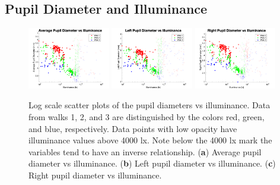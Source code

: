 \documentclass[10pt]{article}
\begin{document}
\subsection{Pupil Diameter and Illuminance}

\begin{figure}[!b]
  \centering
  \includegraphics[width=0.32\textwidth]{./PDvsILM/APDvsILM.png}\label{fig:PDvsILMa}
  \hfill
  \includegraphics[width=0.32\textwidth]{./PDvsILM/LPDvsILM.png}\label{fig:PDvsILMb}
  \includegraphics[width=0.32\textwidth]{./PDvsILM/RPDvsILM.png}\label{fig:PDvsILMc}
  \hfill
  \caption{Log scale scatter plots of the pupil diameters vs illuminance. Data from walks 1, 2, and 3 are distinguished by the colors red, green, and blue, respectively. Data points with low opacity have illuminance values above 4000 lx. Note below the 4000 lx mark the variables tend to have an inverse relationship. (\textbf{a}) Average pupil diameter vs illuminance. (\textbf{b}) Left pupil diameter vs illuminance. (\textbf{c}) Right pupil diameter vs illuminance.
  }
  \label{fig:PDvsILM}
\end{figure}
\end{document}

